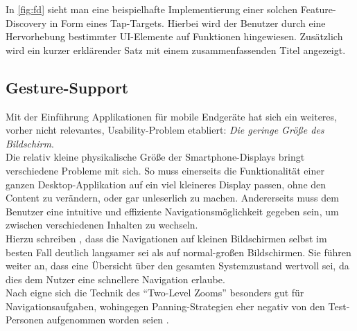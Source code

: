 In \autoref{fig:fd} sieht man eine beispielhafte Implementierung einer solchen Feature-Discovery in Form eines Tap-Targets.
Hierbei wird der Benutzer durch eine Hervorhebung bestimmter UI-Elemente auf Funktionen hingewiesen. 
Zusätzlich wird ein kurzer erklärender Satz mit einem zusammenfassenden Titel angezeigt. \\

\subsection{Gesture-Support}

Mit der Einführung Applikationen für mobile Endgeräte hat sich ein weiteres, vorher nicht relevantes, Usability-Problem etabliert: 
\emph{Die geringe Größe des Bildschirm}. \\

Die relativ kleine physikalische Größe der Smartphone-Displays bringt verschiedene Probleme mit sich. 
So muss einerseits die Funktionalität einer ganzen Desktop-Applikation auf ein viel kleineres Display passen, ohne den Content zu verändern, oder gar unleserlich zu machen.
Andererseits muss dem Benutzer eine intuitive und effiziente Navigationsmöglichkeit gegeben sein, um zwischen verschiedenen Inhalten zu wechseln. \\

Hierzu schreiben \citeauthor{Gutwin04}, dass die Navigationen auf kleinen Bildschirmen selbst im besten Fall deutlich langsamer sei als auf normal-großen Bildschirmen.
Sie führen weiter an, dass eine Übersicht über den gesamten Systemzustand wertvoll sei, da dies dem Nutzer eine schnellere Navigation erlaube. \\
Nach \citeauthor{Gutwin04} eigne sich die Technik des ``Two-Level Zooms'' besonders gut für Navigationsaufgaben, wohingegen Panning-Strategien eher negativ von den Test-Personen aufgenommen worden seien \citep[Seite 8]{Gutwin04}.  
